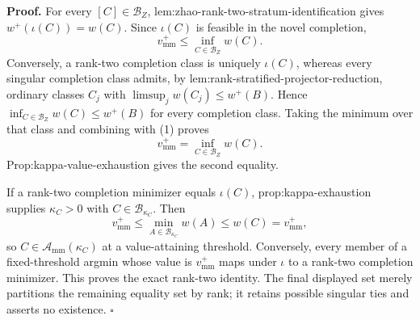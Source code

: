 \textbf{Proof.}
For every \([C]\in\mathcal B_Z\), lem:zhao-rank-two-stratum-identification gives \(w^+(\iota(C))=w(C)\).  Since \(\iota(C)\) is feasible in the novel completion,
\[
v_{\mathrm{mm}}^+\le\inf_{C\in\mathcal B_Z}w(C). \tag{1}
\]
Conversely, a rank-two completion class is uniquely \(\iota(C)\), whereas every singular completion class admits, by lem:rank-stratified-projector-reduction, ordinary classes \(C_j\) with \(\limsup_jw(C_j)\le w^+(B)\).  Hence \(\inf_{C\in\mathcal B_Z}w(C)\le w^+(B)\) for every completion class.  Taking the minimum over that class and combining with (1) proves
\[
v_{\mathrm{mm}}^+=\inf_{C\in\mathcal B_Z}w(C).
\]
Prop:kappa-value-exhaustion gives the second equality.

If a rank-two completion minimizer equals \(\iota(C)\), prop:kappa-exhaustion supplies \(\kappa_C>0\) with \(C\in\mathcal B_{\kappa_C}\).  Then
\[
v_{\mathrm{mm}}^+
\le\min_{A\in\mathcal B_{\kappa_C}}w(A)
\le w(C)=v_{\mathrm{mm}}^+,
\]
so \(C\in\mathcal A_{\mathrm{mm}}(\kappa_C)\) at a value-attaining threshold.  Conversely, every member of a fixed-threshold argmin whose value is \(v_{\mathrm{mm}}^+\) maps under \(\iota\) to a rank-two completion minimizer.  This proves the exact rank-two identity.  The final displayed set merely partitions the remaining equality set by rank; it retains possible singular ties and asserts no existence. \(\square\)